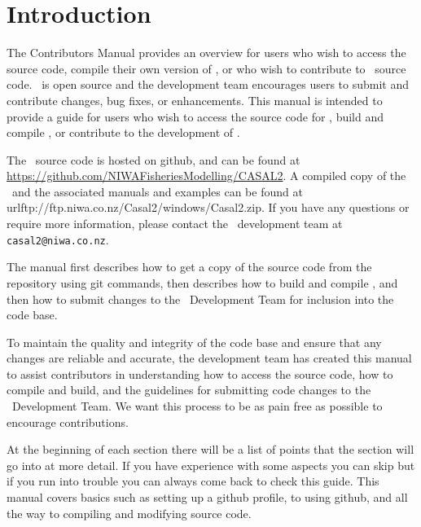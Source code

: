 \section{Introduction\label{sec:Introduction}}

The Contributors Manual provides an overview for users who wish to access the source code, compile their own version of \CNAME , or who wish to contribute to \CNAME\ source code. \CNAME\ is open source and the development team encourages users to submit and contribute changes, bug fixes, or enhancements. This manual is intended to provide a guide for users who wish to access the source code for \CNAME , build and compile  \CNAME , or contribute to the development of \CNAME . 

The \CNAME\ source code is hosted on github, and can be found at \url{https://github.com/NIWAFisheriesModelling/CASAL2}. A compiled copy of the \CNAME\ and the associated manuals and examples can be found at url{ftp://ftp.niwa.co.nz/Casal2/windows/Casal2.zip}. If you have any questions or require more information, please contact the \CNAME\ development team at \texttt{casal2@niwa.co.nz}.  

The manual first describes how to get a copy of the source code from the repository using git commands, then describes how to build and compile \CNAME , and then how to submit changes to the \CNAME\ Development Team for inclusion into the code base.

To maintain the quality and integrity of the code base and ensure that any changes are reliable and accurate, the development team has created this manual to assist contributors in understanding how to access the source code, how to compile and build, and the guidelines for submitting code changes to the \CNAME\ Development Team. We want this process to be as pain free as possible to encourage contributions. 

At the beginning of each section there will be a list of points that the section will go into at more detail. If you have experience with some aspects you can skip but if you run into trouble you can always come back to check this guide. This manual covers basics such as setting up a github profile, to using github, and all the way to compiling and modifying source code.
